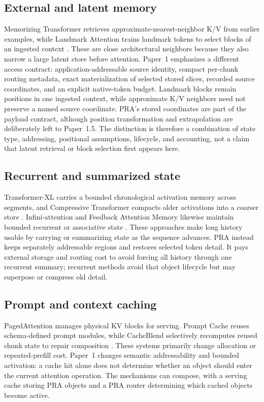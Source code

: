 \documentclass[11pt]{article}
\begin{document}
\subsection{External and latent memory}

Memorizing Transformer retrieves approximate-nearest-neighbor K/V from earlier examples, while
Landmark Attention trains landmark tokens to select blocks of an ingested context
\cite{wu2022memorizing,mohtashami2023landmark}. These are close architectural neighbors because
they also narrow a large latent store before attention. Paper~1 emphasizes a different access
contract: application-addressable source identity, compact per-chunk routing metadata, exact
materialization of selected stored slices, recorded source coordinates, and an explicit
native-token budget. Landmark blocks remain positions in one ingested context, while approximate
K/V neighbors need not preserve a named source coordinate. PRA's stored coordinates are part of
the payload contract, although position transformation and extrapolation are deliberately left to
Paper~1.5. The distinction is therefore a combination of state type, addressing, positional
assumptions, lifecycle, and accounting, not a claim that latent retrieval or block selection
first appears here.

\subsection{Recurrent and summarized state}

Transformer-XL carries a bounded chronological activation memory across segments, and
Compressive Transformer compacts older activations into a coarser store
\cite{dai2019transformerxl,rae2020compressive}. Infini-attention and Feedback Attention Memory
likewise maintain bounded recurrent or associative state
\cite{munkhdalai2024infini,hwang2024fam}. These approaches make long history usable by carrying
or summarizing state as the sequence advances. PRA instead keeps separately addressable regions
and restores selected token detail. It pays external storage and routing cost to avoid forcing
all history through one recurrent summary; recurrent methods avoid that object lifecycle but may
superpose or compress old detail.

\subsection{Prompt and context caching}

PagedAttention manages physical KV blocks for serving. Prompt Cache reuses schema-defined prompt
modules, while CacheBlend selectively recomputes reused chunk state to repair composition
\cite{kwon2023vllm,gim2023promptcache,yao2024cacheblend}. These systems primarily change
allocation or repeated-prefill cost. Paper~1 changes semantic addressability and bounded
activation: a cache hit alone does not determine whether an object should enter the current
attention operation. The mechanisms can compose, with a serving cache storing PRA objects and a
PRA router determining which cached objects become active.
\end{document}
